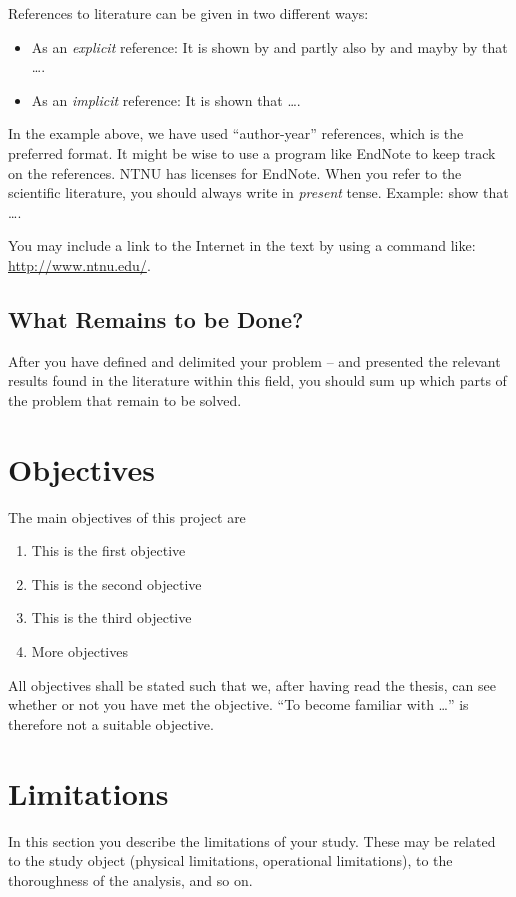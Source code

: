 References to literature can be given in two different ways:
\begin{itemize}
	\item As an \emph{explicit} reference: It is shown by \citet{gri2010NUM} and partly also by \citet{Emd2007} and mayby by \citet{fenton2008risk}  that \ldots.
\item As an \emph{implicit} reference: It is shown \citep[e.g., see][Chap. 4]{Deg2011Geo} that \ldots.
\end{itemize}
In the example above, we have used ``author-year'' references, which is the preferred format. It might be wise to use a program like EndNote to keep track on the references. NTNU has licenses for EndNote. When you refer to the scientific literature, you should always write in \emph{present} tense. Example: \citet{gri2010NUM} show that \ldots. 
\begin{remark}
 You may include a link to the Internet in the text by using a command like: \url{http://www.ntnu.edu/}.
\end{remark} 


\subsection*{What Remains to be Done?}
After you have defined and delimited your problem -- and presented the relevant results found in the literature within this field, you should sum up which parts of the problem that remain to be solved.
\section{Objectives}
The main objectives of this project are
\begin{enumerate}
\item This is the first objective
\item This is the second objective
\item This is the third objective
\item More objectives
\end{enumerate}

All objectives shall be stated such that we, after having read the thesis, can see whether or not you have met the objective. ``To become familiar with \ldots'' is therefore not a suitable objective.

\section{Limitations}
In this section you describe the limitations of your study. These may be related to the study object (physical limitations, operational limitations), to the thoroughness of the analysis, and so on.
